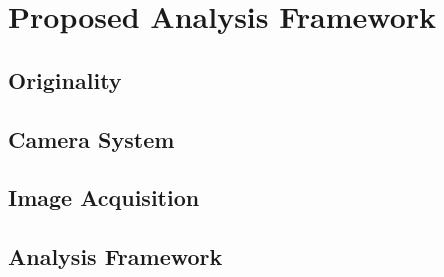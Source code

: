 \chapter{Proposed Analysis Framework}

\section{Originality}
\blindtext 

\section{Camera System}
\blindtext 


\section{Image Acquisition}
\blindtext 

\section{Analysis Framework}
\blindtext 